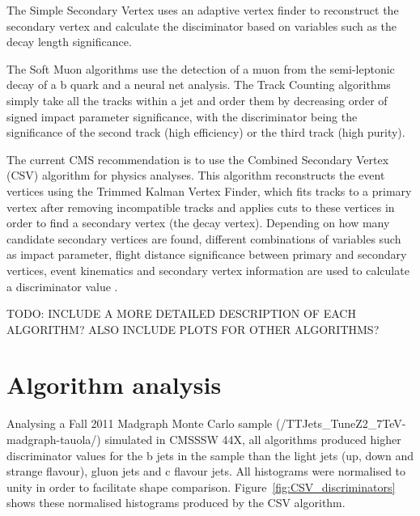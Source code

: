 The Simple Secondary Vertex uses an adaptive vertex finder to reconstruct the secondary vertex and
calculate the disciminator based on variables such as the decay length significance.

The Soft Muon algorithms
use the detection of a muon from the semi-leptonic decay of a b quark and a neural net analysis. The Track
Counting algorithms simply take all the tracks within a jet and order them by decreasing order of signed
impact parameter significance, with the discriminator being the significance of the second track (high efficiency) or
the third track (high purity).

The current CMS recommendation is to use the Combined Secondary Vertex (CSV) algorithm for physics analyses.
This algorithm reconstructs the event vertices using the Trimmed Kalman Vertex Finder, which fits tracks to a
primary vertex after removing incompatible tracks and applies cuts to these vertices in order to find a
secondary vertex (the \b decay vertex). Depending on how many candidate secondary vertices are found,
different combinations of variables such as impact parameter, flight distance significance between primary and
secondary vertices, event kinematics and secondary vertex information are used to calculate a discriminator
value \cite{CSV}.

TODO: INCLUDE A MORE DETAILED DESCRIPTION OF EACH ALGORITHM? ALSO INCLUDE PLOTS FOR OTHER ALGORITHMS?

\section{Algorithm analysis}
\label{s:algorithm_analysis}

Analysing a Fall 2011 \ttbar Madgraph Monte Carlo sample (/TTJets\_TuneZ2\_7TeV-madgraph-tauola/) simulated in
CMSSSW 44X, all algorithms produced higher discriminator values for the b jets in the sample than the light
jets (up, down and strange flavour), gluon jets and c flavour jets. All histograms were normalised to unity in
order to facilitate shape comparison. Figure~\ref{fig:CSV_discriminators} shows these normalised histograms
produced by the CSV algorithm.

